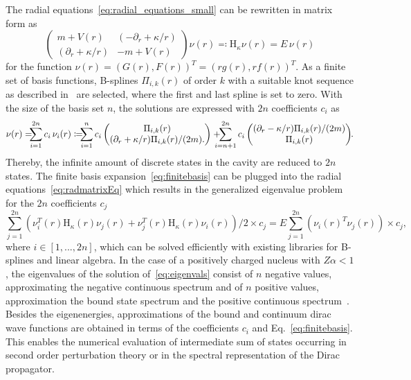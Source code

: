 The radial equations~\eqref{eq:radial_equations_small} can be rewritten in matrix form as
\begin{equation}
\begin{pmatrix}
m+V(r)&(-\partial_r + \kappa/r)\\
(\partial_r + \kappa/r)&-m+V(r)
\end{pmatrix}
\nu(r)\eqqcolon\mathrm{H}_\kappa \nu(r)
= E\,\nu(r)
\label{eq:radmatrixEq}
\end{equation}
for the function $\nu(r)=(G(r),F(r))^T=(r g(r),r f(r))^T$. As a finite set of basis functions, B-splines $\Pi_{i,k}(r)$ of order $k$  with a suitable knot sequence as described in~\cite{johnson1988} are selected, where the first and last spline is set to zero. With the size of the basis set $n$, the solutions are expressed with $2n$ coefficients $c_i$ as
\begin{equation}
\nu(r)=\hspace{-0.2cm}\sum_{i=1}^{2n}c_i\,\nu_i(r)\coloneqq \hspace{-0.2cm}\sum_{i=1}^n
c_i\begin{pmatrix}
\Pi_{i,k}(r)\\
(\partial_r +\kappa/r)\Pi_{i,k}(r)/(2m).
\end{pmatrix}
+\hspace{-0.3cm}
\sum_{i=n+1}^{2n}c_i
\begin{pmatrix}
(\partial_r -\kappa/r)\Pi_{i,k}(r)/(2m)\\
\Pi_{i,k}(r)
\end{pmatrix}\hspace{-0.1cm}.
\label{eq:finitebasis}
\end{equation}
Thereby, the infinite amount of discrete states in the cavity are reduced to $2n$ states. The finite basis expansion~\eqref{eq:finitebasis} can be plugged into the radial equations~\eqref{eq:radmatrixEq} which results in the generalized eigenvalue problem~\cite{Shabaev2004} for the $2n$ coefficients $c_j$
\begin{equation}
\sum_{j=1}^{2n} \left(\nu_i^T(r)\mathrm{H}_\kappa(r)\nu_j(r)+\nu_j^T(r)\mathrm{H}_\kappa(r)\nu_i(r)\right)/2 \times c_j = E \sum_{j=1}^{2n}(\nu_i(r)^T\nu_j(r))\times c_j,
\label{eq:eigenvals}
\end{equation}
where $i\in [1,...,2n]$, 
which can be solved efficiently with existing libraries for B-splines and linear algebra. In the case of a positively charged nucleus with $Z\alpha<1$, the eigenvalues of the solution of~\eqref{eq:eigenvals} consist of $n$ negative values, approximating the negative continuous spectrum and of $n$ positive values, approximation the bound state spectrum and the positive continuous spectrum~\cite{drake1981}. Besides the eigenenergies, approximations of the bound and continuum dirac wave functions are obtained in terms of the coefficients $c_i$ and Eq.~\eqref{eq:finitebasis}. This enables the numerical evaluation of intermediate sum of states occurring in second order perturbation theory or in the spectral representation of the Dirac propagator.





